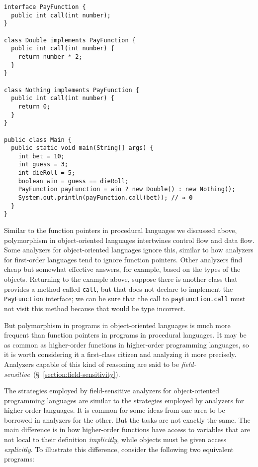 \documentclass[12pt, oneside]{book}
\begin{document}
\begin{Verbatim}
interface PayFunction {
  public int call(int number);
}

class Double implements PayFunction {
  public int call(int number) {
    return number * 2;
  }
}

class Nothing implements PayFunction {
  public int call(int number) {
    return 0;
  }
}

public class Main {
  public static void main(String[] args) {
    int bet = 10;
    int guess = 3;
    int dieRoll = 5;
    boolean win = guess == dieRoll;
    PayFunction payFunction = win ? new Double() : new Nothing();
    System.out.println(payFunction.call(bet)); // ⇒ 0
  }
}
\end{Verbatim}

Similar to the function pointers in procedural languages we discussed above, polymorphism in object-oriented languages intertwines control flow and data flow. Some analyzers for object-oriented languages ignore this, similar to how analyzers for first-order languages tend to ignore function pointers. Other analyzers find cheap but somewhat effective answers, for example, based on the types of the objects. Returning to the example above, suppose there is another class that provides a method called \texttt{call}, but that does not declare to implement the \texttt{PayFunction} interface; we can be sure that the call to \texttt{payFunction.call} must not visit this method because that would be type incorrect.

But polymorphism in programs in object-oriented languages is much more frequent than function pointers in programs in procedural languages. It may be as common as higher-order functions in higher-order programming languages, so it is worth considering it a first-class citizen and analyzing it more precisely. Analyzers capable of this kind of reasoning are said to be \emph{field-sensitive}~(§~\ref{section:field-sensitivity}).

The strategies employed by field-sensitive analyzers for object-oriented programming languages are similar to the strategies employed by analyzers for higher-order languages. It is common for some ideas from one area to be borrowed in analyzers for the other. But the tasks are not exactly the same. The main difference is in how higher-order functions have access to variables that are not local to their definition \emph{implicitly}, while objects must be given access \emph{explicitly}. To illustrate this difference, consider the following two equivalent programs:
\end{document}
